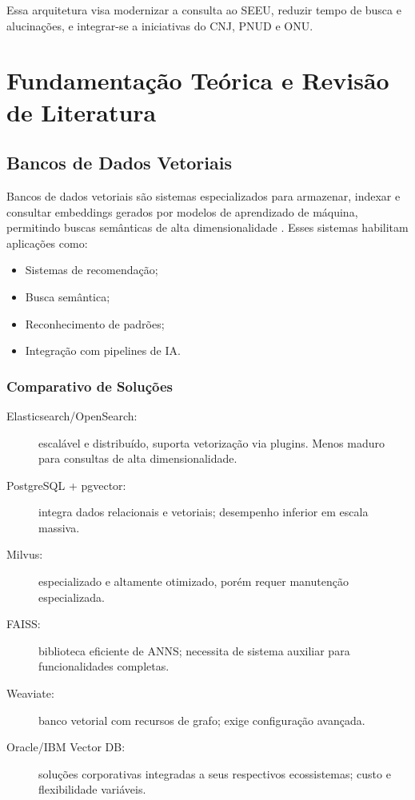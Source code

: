 Essa arquitetura visa modernizar a consulta ao SEEU, reduzir tempo de busca e alucinações, e integrar-se a iniciativas do CNJ, PNUD e ONU.


\chapter{Fundamentação Teórica e Revisão de Literatura}
\label{chap:fundamentacao_literatura}

\section{Bancos de Dados Vetoriais}
Bancos de dados vetoriais são sistemas especializados para armazenar, indexar e consultar embeddings gerados por modelos de aprendizado de máquina, permitindo buscas semânticas de alta dimensionalidade \cite{taipalus2024vector}. Esses sistemas habilitam aplicações como:
\begin{itemize}[label=\textbullet]
  \item Sistemas de recomendação;
  \item Busca semântica;
  \item Reconhecimento de padrões;
  \item Integração com pipelines de IA.
\end{itemize}

\subsection{Comparativo de Soluções}
\begin{description}
  \item[Elasticsearch/OpenSearch:] escalável e distribuído, suporta vetorização via plugins. Menos maduro para consultas de alta dimensionalidade.
  \item[PostgreSQL + pgvector:] integra dados relacionais e vetoriais; desempenho inferior em escala massiva.
  \item[Milvus:] especializado e altamente otimizado, porém requer manutenção especializada.
  \item[FAISS:] biblioteca eficiente de ANNS; necessita de sistema auxiliar para funcionalidades completas.
  \item[Weaviate:] banco vetorial com recursos de grafo; exige configuração avançada.
  \item[Oracle/IBM Vector DB:] soluções corporativas integradas a seus respectivos ecossistemas; custo e flexibilidade variáveis.
\end{description}

